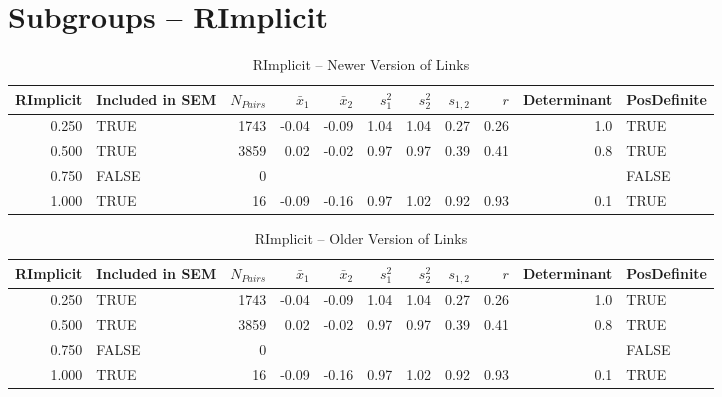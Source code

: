\documentclass{article}\usepackage[]{graphicx}\usepackage[]{color}
\begin{document}
\section{Subgroups --  RImplicit }%
\begin{table}[ht]
\centering
\begin{tabular}{rlrrrrrrrrl}
  \hline
RImplicit & Included in SEM & $N_{Pairs}$ & $\bar{x}_1$ & $\bar{x}_2$ & $s_1^2$ & $s_2^2$ & $s_{1,2}$ & $r$ & Determinant & PosDefinite \\ 
  \hline
0.250 & TRUE & 1743 & -0.04 & -0.09 & 1.04 & 1.04 & 0.27 & 0.26 & 1.0 & TRUE \\ 
  0.500 & TRUE & 3859 & 0.02 & -0.02 & 0.97 & 0.97 & 0.39 & 0.41 & 0.8 & TRUE \\ 
  0.750 & FALSE & 0 &  &  &  &  &  &  &  & FALSE \\ 
  1.000 & TRUE & 16 & -0.09 & -0.16 & 0.97 & 1.02 & 0.92 & 0.93 & 0.1 & TRUE \\ 
   \hline
\end{tabular}
\caption{RImplicit -- Newer Version of Links} 
\end{table}
\begin{table}[ht]
\centering
\begin{tabular}{rlrrrrrrrrl}
  \hline
RImplicit & Included in SEM & $N_{Pairs}$ & $\bar{x}_1$ & $\bar{x}_2$ & $s_1^2$ & $s_2^2$ & $s_{1,2}$ & $r$ & Determinant & PosDefinite \\ 
  \hline
0.250 & TRUE & 1743 & -0.04 & -0.09 & 1.04 & 1.04 & 0.27 & 0.26 & 1.0 & TRUE \\ 
  0.500 & TRUE & 3859 & 0.02 & -0.02 & 0.97 & 0.97 & 0.39 & 0.41 & 0.8 & TRUE \\ 
  0.750 & FALSE & 0 &  &  &  &  &  &  &  & FALSE \\ 
  1.000 & TRUE & 16 & -0.09 & -0.16 & 0.97 & 1.02 & 0.92 & 0.93 & 0.1 & TRUE \\ 
   \hline
\end{tabular}
\caption{RImplicit -- Older Version of Links} 
\end{table}
\end{document}
